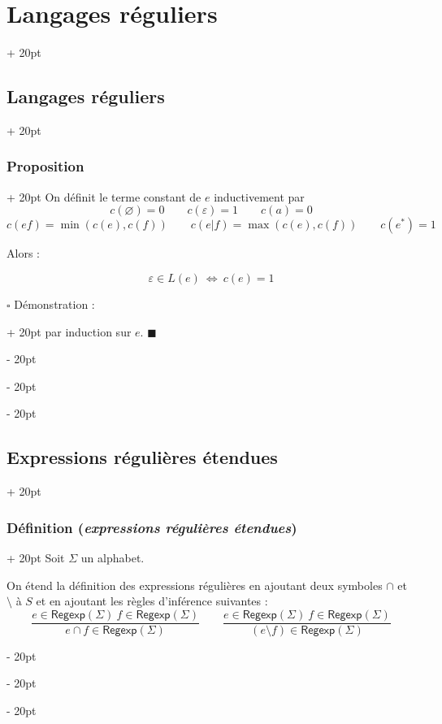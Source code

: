 \documentclass[a4paper, 12pt, twoside]{article}
\newcommand{\ssi}{\ \Leftrightarrow \ }
\newcommand{\ind}[1][20pt]{\advance\leftskip + #1}
\newcommand{\deind}[1][20pt]{\advance\leftskip - #1}
\newenvironment{indt}[2][20pt]{#2 \par \ind[#1]}{\par \deind} %
\newenvironment{proof}[1][{Démonstration :}]{\begin{indt}{$\square$ #1}}{$\blacksquare$ \end{indt}}
\newcommand{\Regexp}{\mathsf{Regexp}}
\begin{document}
\begin{indt}{\section{Langages réguliers}}
\begin{indt}{\subsection{Langages réguliers}}
\begin{indt}{\subsubsection{Proposition}}
                On définit le terme constant de $e$ inductivement par
                \[
                    c(\varnothing) = 0
                    \qquad
                    c(\varepsilon) = 1
                    \qquad
                    c(a) = 0
                \]
                \[
                    c(ef) = \min(c(e), c(f))
                    \qquad
                    c(e|f) = \max(c(e), c(f))
                    \qquad
                    c(e^*) = 1
                \]

                \vspace{6pt}
                
                Alors :
                \begin{emphBox}
                    \[
                        \varepsilon \in L(e) \ssi c(e) = 1
                    \]
                \end{emphBox}

                \vspace{12pt}
                
                \begin{proof}
                     par induction sur $e$.
                \end{proof}
            \end{indt}
        \end{indt}

        \vspace{12pt}
        
        \begin{indt}{\subsection{Expressions régulières étendues}}
            \begin{indt}{\subsubsection{Définition (\textit{expressions régulières étendues})}}
                Soit $\Sigma$ un alphabet.

                On étend la définition des expressions régulières en ajoutant deux symboles $\cap$ et $\setminus$ à $S$ et en ajoutant les règles d'inférence suivantes :
                \[
                    \dfrac{e \in \Regexp(\Sigma)\ f \in \Regexp(\Sigma)}{e \cap f \in \Regexp(\Sigma)}
                    \qquad
                    \dfrac{e \in \Regexp(\Sigma)\ f \in \Regexp(\Sigma)}{(e \setminus f) \in \Regexp(\Sigma)}
                \]


\end{indt}
\end{indt}
\end{indt}
\end{document}
